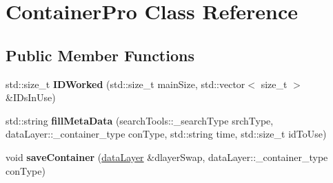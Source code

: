 \hypertarget{class_container_pro}{}\section{Container\+Pro Class Reference}
\label{class_container_pro}
\subsection*{Public Member Functions}
\begin{DoxyCompactItemize}
\item 
\hypertarget{class_container_pro_a393f01d51dbca7964d94c31fd6d87055}{}std\+::size\+\_\+t {\bfseries I\+D\+Worked} (std\+::size\+\_\+t main\+Size, std\+::vector$<$ size\+\_\+t $>$ \&I\+Ds\+In\+Use)\label{class_container_pro_a393f01d51dbca7964d94c31fd6d87055}

\item 
\hypertarget{class_container_pro_ae530346b0fb954f22718781f58d7ad0f}{}std\+::string {\bfseries fill\+Meta\+Data} (search\+Tools\+::\+\_\+search\+Type srch\+Type, data\+Layer\+::\+\_\+container\+\_\+type con\+Type, std\+::string time, std\+::size\+\_\+t id\+To\+Use)\label{class_container_pro_ae530346b0fb954f22718781f58d7ad0f}

\item 
\hypertarget{class_container_pro_ae02d5040ef0694a8416fddf5a96e23ca}{}void {\bfseries save\+Container} (\hyperlink{classdata_layer}{data\+Layer} \&dlayer\+Swap, data\+Layer\+::\+\_\+container\+\_\+type con\+Type)\label{class_container_pro_ae02d5040ef0694a8416fddf5a96e23ca}

\end{DoxyCompactItemize}
